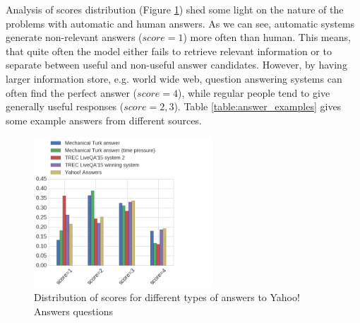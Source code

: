 \documentclass[11pt,letterpaper]{article}
\begin{document}
Analysis of scores distribution (Figure \ref{fig:scores_distribution}) shed some light on the nature of the problems with automatic and human answers.
As we can see, automatic systems generate non-relevant answers ($score=1$) more often than human.
This means, that quite often the model either fails to retrieve relevant information or to separate between useful and non-useful answer candidates.
However, by having larger information store, e.g. world wide web, question answering systems can often find the perfect answer ($score=4$), while regular people tend to give generally useful responses ($score=2,3$).
Table \ref{table:answer_examples} gives some example answers from different sources.

\begin{figure}[h]
\centering
\includegraphics[width=0.6\textwidth]{img/scores_distribution}
\caption{Distribution of scores for different types of answers to Yahoo! Answers questions}
\label{fig:scores_distribution}
\end{figure}
\end{document}
